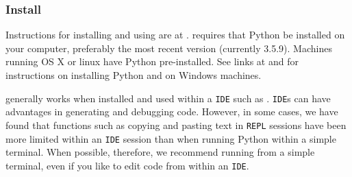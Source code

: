 \subsubsection{\howto Install \mpfshell}

Instructions for installing and using \mpfshell are at .
\mpfshell requires that Python be installed on your computer, preferably the most recent version (currently 3.5.9).
Machines running OS X or linux have Python pre-installed.
See links at  and  for instructions on installing Python and \mpfshell on Windows machines.
\begin{kaobox}[frametitle=Using \mpfshell in \htmladdnormallink{Integrated Development Environments}{https://en.wikipedia.org/wiki/Integrated_development_environment}  (\texttt{IDE}s)]
	\mpfshell generally works when installed and used within a \python \texttt{IDE} such as .
	\python \texttt{IDE}s can have advantages in generating and debugging code.
	However, in some cases, we have found that functions such as copying and pasting text in \texttt{REPL} sessions have been more limited within an \texttt{IDE} session than when running Python within a simple terminal.
	When possible, therefore, we recommend running \mpfshell from a simple terminal, even if you like to edit code from within an \texttt{IDE}.
\end{kaobox}

